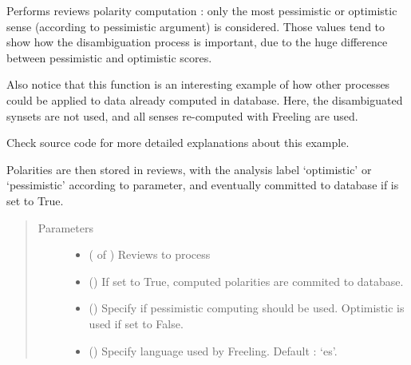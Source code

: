 \documentclass[letterpaper,10pt,english]{sphinxmanual}
\begin{document}
\begin{fulllineitems}
\label{\detokenize{analysis:loacore.analysis.sentiment_analysis.compute_extreme_reviews_polarity}}
Performs  reviews polarity computation : only the most pessimistic or optimistic sense
(according to pessimistic argument) is considered. Those values tend to show how the disambiguation process is
important, due to the huge difference between pessimistic and optimistic scores.

Also notice that this function is an interesting example of how other processes could be applied to data already
computed in database. Here, the disambiguated synsets are not used, and all senses re-computed with Freeling are
used.

Check source code for more detailed explanations about this example.

Polarities are then stored in reviews, with the analysis label ‘optimistic’ or ‘pessimistic’ according to
 parameter, and eventually committed to database if  is set to True.
\begin{quote}\begin{description}
\item[{Parameters}] \leavevmode\begin{itemize}
\item {} 
 ( of {\hyperref[\detokenize{classes:loacore.classes.classes.Review}]{}}) \textendash{} Reviews to process

\item {} 
 () \textendash{} If set to True, computed polarities are commited to database.

\item {} 
 () \textendash{} Specify if pessimistic computing should be used. Optimistic is used if set to False.

\item {} 
 () \textendash{} 
Specify language used by Freeling. Default : ‘es’.


\end{itemize}
\end{description}
\end{quote}
\end{fulllineitems}
\end{document}
